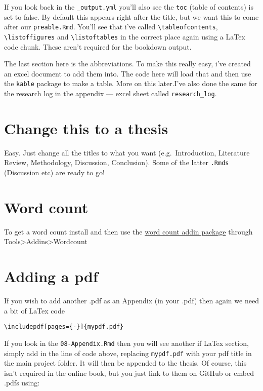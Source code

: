 \documentclass[
  12pt,
  oneside]{book}
\begin{document}
If you look back in the \texttt{\_output.yml} you'll also see the \texttt{toc} (table of contents) is set to false. By default this appears right after the title, but we want this to come after our \texttt{preable.Rmd}. You'll see that i've called \texttt{\textbackslash{}tableofcontents}, \texttt{\textbackslash{}listoffigures} and \texttt{\textbackslash{}listoftables} in the correct place again using a LaTex code chunk. These aren't required for the bookdown output.

The last section here is the abbreviations. To make this really easy, i've created an excel document to add them into. The code here will load that and then use the \texttt{kable} package to make a table. More on this later.I've also done the same for the research log in the appendix --- excel sheet called \texttt{research\_log}.

\section{Change this to a thesis}\label{change-this-to-a-thesis}

Easy. Just change all the titles to what you want (e.g.~Introduction, Literature Review, Methodology, Discussion, Conclusion). Some of the latter \texttt{.Rmds} (Discussion etc) are ready to go!

\section{Word count}\label{word-count}

To get a word count install and then use the \href{https://github.com/benmarwick/wordcountaddin}{word count addin package} through Tools\textgreater Addins\textgreater Wordcount

\section{Adding a pdf}\label{adding-a-pdf}

If you wish to add another .pdf as an Appendix (in your .pdf) then again we need a bit of LaTex code

\texttt{\textbackslash{}includepdf{[}pages=\{-\}{]}\{mypdf.pdf\}}

If you look in the \texttt{08-Appendix.Rmd} then you will see another if LaTex section, simply add in the line of code above, replacing \texttt{mypdf.pdf} with your pdf title in the main project folder. It will then be appended to the thesis. Of course, this isn't required in the online book, but you just link to them on GitHub or embed .pdfs using:
\end{document}
